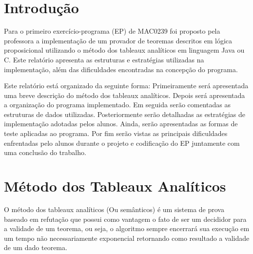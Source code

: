 \documentclass[brazil,times]{abnt}
\begin{document}





\data{\today}

\capa

\folhaderosto

\section*{Introdução} Para o primeiro exercício-programa (EP) de MAC0239 foi
proposto pela professora a implementação de um provador de teoremas descritos
em lógica proposicional utilizando o método dos tableaux analíticos em linguagem
Java ou C. Este relatório apresenta as estruturas e estratégias utilizadas na
implementação, além das dificuldades encontradas na concepção do programa.
	
Este relatório está organizado da seguinte forma: Primeiramente será apresentada
uma breve descrição do método dos tableaux analíticos. Depois será
apresentada a organização do programa implementado. Em seguida serão
comentadas as estruturas de dados utilizadas. Posteriormente serão detalhadas
as estratégias de implementação adotadas pelos alunos. Ainda, serão
apresentadas as formas de teste aplicadas ao programa. Por fim serão
vistas as principais dificuldades enfrentadas pelo alunos durante o projeto e
codificação do EP juntamente com uma conclusão do trabalho.

\section*{Método dos Tableaux Analíticos}
	O método dos tableaux analíticos (Ou semânticos) é um sistema de prova baseado
	em refutação que possui como vantagem o fato de ser um decididor para a
	validade de um teorema, ou seja, o algoritmo sempre encerrará sua execução em
	um tempo não necessariamente exponencial retornando como resultado a validade
	de um dado teorema.
	
\end{document}
